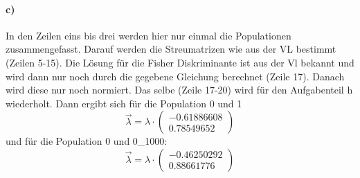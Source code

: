 \paragraph{c)} \quad \newline

In den Zeilen eins bis drei werden hier nur einmal die Populationen zusammengefasst. Darauf werden 
die Streumatrizen wie aus der VL bestimmt (Zeilen 5-15). Die Lösung für die Fisher Diskriminante 
ist aus der Vl bekannt und wird dann nur noch durch die gegebene Gleichung berechnet (Zeile 17). 
Danach wird diese nur noch normiert. Das selbe (Zeile 17-20) wird für den Aufgabenteil h wiederholt. 
Dann ergibt sich für die Population 0 und 1
\begin{equation}
\vec{\lambda} = \lambda \cdot
\begin{pmatrix}
-0.61886608\\ 
0.78549652
\end{pmatrix}
\end{equation}
und für die Population 0 und 0\_1000:
\begin{equation}
\vec{\lambda} = \lambda \cdot
\begin{pmatrix}
-0.46250292 \\
0.88661776
\end{pmatrix}
\end{equation}
